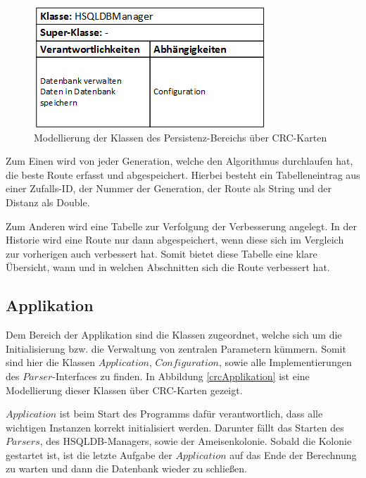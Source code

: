 \begin{figure}[h]
	\centering
	\includegraphics[width=0.4\linewidth]{images/CRC_persistenz.png}
	\caption{Modellierung der Klassen des Persistenz-Bereichs über CRC-Karten}
	\label{crcPersistenz}
\end{figure}

Zum Einen wird von jeder Generation, welche den Algorithmus durchlaufen hat, die beste Route erfasst und abgespeichert. Hierbei besteht ein Tabelleneintrag aus einer Zufalls-ID, der Nummer der Generation, der Route als String und der Distanz als Double. 

Zum Anderen wird eine Tabelle zur Verfolgung der Verbesserung angelegt. In der Historie wird eine Route nur dann abgespeichert, wenn diese sich im Vergleich zur vorherigen auch verbessert hat. Somit bietet diese Tabelle eine klare Übersicht, wann und in welchen Abschnitten sich die Route verbessert hat.

\subsection{Applikation}
Dem Bereich der Applikation sind die Klassen zugeordnet, welche sich um die Initialisierung bzw. die Verwaltung von zentralen Parametern kümmern. Somit sind hier die Klassen $Application$, $Configuration$, sowie alle Implementierungen des $Parser$-Interfaces zu finden. In Abbildung \ref{crcApplikation} ist eine Modellierung dieser Klassen über CRC-Karten gezeigt.

$Application$ ist beim Start des Programms dafür verantwortlich, dass alle wichtigen Instanzen korrekt initialisiert werden. Darunter fällt das Starten des $Parsers$, des \ac{HSQLDB}-Managers, sowie der Ameisenkolonie. Sobald die Kolonie gestartet ist, ist die letzte Aufgabe der $Application$ auf das Ende der Berechnung zu warten und dann die Datenbank wieder zu schließen.

